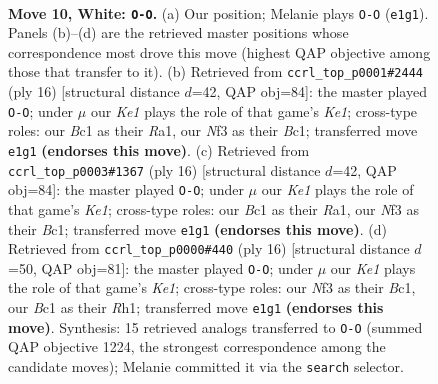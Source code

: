 \documentclass[11pt]{article}
\begin{document}
\clearpage

\begin{figure}[p]\centering
\begin{subfigure}{0.46\textwidth}\centering
\resizebox{\linewidth}{!}{%
\newchessgame
\chessboard[
  setfen={rnbqk2r/pp2p1b1/6p1/2pB1p1p/3PP3/2P2N2/P4PPP/R1BQK2R w KQkq - 0 10},
  showmover=false,
  pgfstyle=straightmove, color=movearrow, markmove={e1-g1}
]}
\caption{}
\end{subfigure}\hfill
\begin{subfigure}{0.46\textwidth}\centering
\resizebox{\linewidth}{!}{%
\newchessgame
\chessboard[
  setfen={rnbq1rk1/pp2ppbp/6p1/2p5/2BP4/2P1PN2/P4PPP/R1BQK2R w KQ - 0 9},
  showmover=false,
  pgfstyle=straightmove, color=movearrow, markmove={e1-g1}
]}
\caption{}
\end{subfigure}
\\[4pt]
\begin{subfigure}{0.46\textwidth}\centering
\resizebox{\linewidth}{!}{%
\newchessgame
\chessboard[
  setfen={rnbq1rk1/pp2ppbp/6p1/2p5/2BP4/2P1PN2/P4PPP/R1BQK2R w KQ - 0 9},
  showmover=false,
  pgfstyle=straightmove, color=movearrow, markmove={e1-g1}
]}
\caption{}
\end{subfigure}\hfill
\begin{subfigure}{0.46\textwidth}\centering
\resizebox{\linewidth}{!}{%
\newchessgame
\chessboard[
  setfen={rnbq1rk1/pp2ppbp/6p1/2p5/2BPP3/2P5/P3NPPP/R1BQK2R w KQ - 0 9},
  showmover=false,
  pgfstyle=straightmove, color=movearrow, markmove={e1-g1}
]}
\caption{}
\end{subfigure}
\caption{\textbf{Move 10, White: \texttt{O-O}.} (a) Our position; Melanie plays \texttt{O-O} (\texttt{e1g1}). Panels (b)--(d) are the retrieved master positions whose correspondence most drove this move (highest QAP objective among those that transfer to it). (b) Retrieved from \texttt{ccrl\_top\_p0001\#2444} (ply 16) [structural distance $d$=42, QAP obj=84]: the master played \texttt{O-O}; under $\mu$ our \emph{Ke1} plays the role of that game's \emph{Ke1}; cross-type roles: our \emph{B}c1 as their \emph{R}a1, our \emph{N}f3 as their \emph{B}c1; transferred move \texttt{e1g1} \textbf{(endorses this move)}. (c) Retrieved from \texttt{ccrl\_top\_p0003\#1367} (ply 16) [structural distance $d$=42, QAP obj=84]: the master played \texttt{O-O}; under $\mu$ our \emph{Ke1} plays the role of that game's \emph{Ke1}; cross-type roles: our \emph{B}c1 as their \emph{R}a1, our \emph{N}f3 as their \emph{B}c1; transferred move \texttt{e1g1} \textbf{(endorses this move)}. (d) Retrieved from \texttt{ccrl\_top\_p0000\#440} (ply 16) [structural distance $d$=50, QAP obj=81]: the master played \texttt{O-O}; under $\mu$ our \emph{Ke1} plays the role of that game's \emph{Ke1}; cross-type roles: our \emph{N}f3 as their \emph{B}c1, our \emph{B}c1 as their \emph{R}h1; transferred move \texttt{e1g1} \textbf{(endorses this move)}. Synthesis: 15 retrieved analogs transferred to \texttt{O-O} (summed QAP objective 1224, the strongest correspondence among the candidate moves); Melanie committed it via the \texttt{search} selector.}
\label{fig:thought-m18}
\end{figure}
\end{document}
